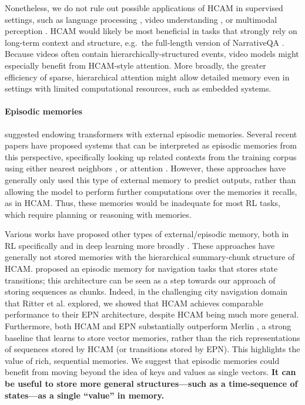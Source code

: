 \documentclass{article}
\begin{document}
Nonetheless, we do not rule out possible applications of HCAM in supervised settings, such as language processing \citep{raffel2020exploring,brown2020language}, video understanding \citep{sun2019learning}, or multimodal perception \citep{jaegle2021perceiver}. HCAM would likely be most beneficial in tasks that strongly rely on long-term context and structure, e.g.\ the full-length version of NarrativeQA \citep{kovcisky2018narrativeqa}. Because videos often contain hierarchically-structured events, video models might especially benefit from HCAM-style attention. More broadly, the greater efficiency of sparse, hierarchical attention might allow detailed memory even in settings with limited computational resources, such as embedded systems.\vspace{-0.5em}

\paragraph{Episodic memories} \citet{nematzadeh2020memory} suggested endowing transformers with external episodic memories. Several recent papers have proposed systems that can be interpreted as episodic memories from this perspective, specifically looking up related contexts from the training corpus using either nearest neighbors \citep{khandelwal2019generalization}, or attention \citep{yogatama2021adaptive}. However, these approaches have generally only used this type of external memory to predict outputs, rather than allowing the model to perform further computations over the memories it recalls, as in HCAM. Thus, these memories would be inadequate for most RL tasks, which require planning or reasoning with memories.

Various works have proposed other types of external/episodic memory, both in RL specifically \citep[e.g.][]{wayne2018unsupervised,hung2019optimizing,fortunato2019generalization} and in deep learning more broadly \citep[e.g.][]{santoro2016meta, graves2016hybrid}. These approaches have generally not stored memories with the hierarchical summary-chunk structure of HCAM. \citet{ritter2020rapid} proposed an episodic memory for navigation tasks that stores state transitions; this architecture can be seen as a step towards our approach of storing sequences as chunks. Indeed, in the challenging city navigation domain that Ritter et al. explored, we showed that HCAM achieves comparable performance to their EPN architecture, despite HCAM being much more general. Furthermore, both HCAM and EPN substantially outperform Merlin \citep{wayne2018unsupervised}, a strong baseline that learns to store vector memories, rather than the rich representations of sequences stored by HCAM (or transitions stored by EPN). This highlights the value of rich, sequential memories. We suggest that episodic memories could benefit from moving beyond the idea of keys and values as single vectors. \textbf{It can be useful to store more general structures---such as a time-sequence of states---as a single ``value'' in memory.}
\end{document}

